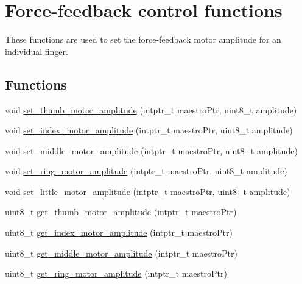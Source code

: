 \hypertarget{group__force_feedback_control}{}\section{Force-\/feedback control functions}
\label{group__force_feedback_control}


These functions are used to set the force-\/feedback motor amplitude for an individual finger.  


\subsection*{Functions}
\begin{DoxyCompactItemize}
\item 
void \hyperlink{group__force_feedback_control_gab4d208770cc93f80cb1815fe86e2be31}{set\+\_\+thumb\+\_\+motor\+\_\+amplitude} (intptr\+\_\+t maestro\+Ptr, uint8\+\_\+t amplitude)
\item 
void \hyperlink{group__force_feedback_control_gae4b41d284100a6b343cd684ecd2d06a3}{set\+\_\+index\+\_\+motor\+\_\+amplitude} (intptr\+\_\+t maestro\+Ptr, uint8\+\_\+t amplitude)
\item 
void \hyperlink{group__force_feedback_control_gace05e531e30dc784432e8bffa0fdb72b}{set\+\_\+middle\+\_\+motor\+\_\+amplitude} (intptr\+\_\+t maestro\+Ptr, uint8\+\_\+t amplitude)
\item 
void \hyperlink{group__force_feedback_control_ga0e4501e2e7b288b6c99f19e3617308eb}{set\+\_\+ring\+\_\+motor\+\_\+amplitude} (intptr\+\_\+t maestro\+Ptr, uint8\+\_\+t amplitude)
\item 
void \hyperlink{group__force_feedback_control_ga7bf117f412a5a181467035ff97515866}{set\+\_\+little\+\_\+motor\+\_\+amplitude} (intptr\+\_\+t maestro\+Ptr, uint8\+\_\+t amplitude)
\item 
uint8\+\_\+t \hyperlink{group__force_feedback_control_ga54aef0ba5f346eb893bb9e18bdd9a7c6}{get\+\_\+thumb\+\_\+motor\+\_\+amplitude} (intptr\+\_\+t maestro\+Ptr)
\item 
uint8\+\_\+t \hyperlink{group__force_feedback_control_ga8449502fafb4bb8b163ba2fa2ef9d743}{get\+\_\+index\+\_\+motor\+\_\+amplitude} (intptr\+\_\+t maestro\+Ptr)
\item 
uint8\+\_\+t \hyperlink{group__force_feedback_control_ga8d6036a18ed2a0a977fbd861b373f389}{get\+\_\+middle\+\_\+motor\+\_\+amplitude} (intptr\+\_\+t maestro\+Ptr)
\item 
uint8\+\_\+t \hyperlink{group__force_feedback_control_ga10d53dad9720a77b092ff74d7d7c4111}{get\+\_\+ring\+\_\+motor\+\_\+amplitude} (intptr\+\_\+t maestro\+Ptr)

\end{DoxyCompactItemize}
